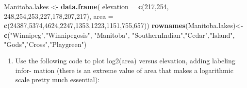 \documentclass[
]{article}
\newenvironment{Shaded}{\begin{snugshade}}{\end{snugshade}}
\newcommand{\DataTypeTok}[1]{\textcolor[rgb]{0.13,0.29,0.53}{#1}}
\newcommand{\DecValTok}[1]{\textcolor[rgb]{0.00,0.00,0.81}{#1}}
\newcommand{\KeywordTok}[1]{\textcolor[rgb]{0.13,0.29,0.53}{\textbf{#1}}}
\newcommand{\NormalTok}[1]{#1}
\newcommand{\StringTok}[1]{\textcolor[rgb]{0.31,0.60,0.02}{#1}}
\providecommand{\tightlist}{%
  \setlength{\itemsep}{0pt}\setlength{\parskip}{0pt}}
\begin{document}
\begin{Shaded}
\begin{Highlighting}[]
\NormalTok{Manitoba.lakes <-}\StringTok{ }\KeywordTok{data.frame}\NormalTok{(}
                  \DataTypeTok{elevation =} \KeywordTok{c}\NormalTok{(}\DecValTok{217}\NormalTok{,}\DecValTok{254}\NormalTok{, }\DecValTok{248}\NormalTok{,}\DecValTok{254}\NormalTok{,}\DecValTok{253}\NormalTok{,}\DecValTok{227}\NormalTok{,}\DecValTok{178}\NormalTok{,}\DecValTok{207}\NormalTok{,}\DecValTok{217}\NormalTok{), }
                  \DataTypeTok{area =} \KeywordTok{c}\NormalTok{(}\DecValTok{24387}\NormalTok{,}\DecValTok{5374}\NormalTok{,}\DecValTok{4624}\NormalTok{,}\DecValTok{2247}\NormalTok{,}\DecValTok{1353}\NormalTok{,}\DecValTok{1223}\NormalTok{,}\DecValTok{1151}\NormalTok{,}\DecValTok{755}\NormalTok{,}\DecValTok{657}\NormalTok{))}
\KeywordTok{rownames}\NormalTok{(Manitoba.lakes)<-}\KeywordTok{c}\NormalTok{(}\StringTok{"Winnipeg"}\NormalTok{,}\StringTok{"Winnipegosis"}\NormalTok{, }\StringTok{"Manitoba"}\NormalTok{,}
                          \StringTok{"SouthernIndian"}\NormalTok{,}\StringTok{"Cedar"}\NormalTok{,}\StringTok{"Island"}\NormalTok{,}
                          \StringTok{"Gods"}\NormalTok{,}\StringTok{"Cross"}\NormalTok{,}\StringTok{"Playgreen"}\NormalTok{)}
\end{Highlighting}
\end{Shaded}

\begin{enumerate}
\def\labelenumi{(\alph{enumi})}
\tightlist
\item
  Use the following code to plot log2(area) versus elevation, adding
  labeling infor- mation (there is an extreme value of area that makes a
  logarithmic scale pretty much essential):
\end{enumerate}
\end{document}
